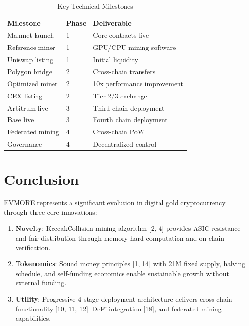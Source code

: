 \documentclass[11pt,a4paper]{article}
\begin{document}
\begin{table}[h]
\centering
\begin{tabular}{@{}lll@{}}
\toprule
\textbf{Milestone} & \textbf{Phase} & \textbf{Deliverable} \\
\midrule
Mainnet launch & 1 & Core contracts live \\
Reference miner & 1 & GPU/CPU mining software \\
Uniswap listing & 1 & Initial liquidity \\
Polygon bridge & 2 & Cross-chain transfers \\
Optimized miner & 2 & 10x performance improvement \\
CEX listing & 2 & Tier 2/3 exchange \\
Arbitrum live & 3 & Third chain deployment \\
Base live & 3 & Fourth chain deployment \\
Federated mining & 4 & Cross-chain PoW \\
Governance & 4 & Decentralized control \\
\bottomrule
\end{tabular}
\caption{Key Technical Milestones}
\end{table}

\section{Conclusion}

EVMORE represents a significant evolution in digital gold cryptocurrency through three core innovations:

\begin{enumerate}
    \item \textbf{Novelty}: KeccakCollision mining algorithm [2, 4] provides ASIC resistance and fair distribution through memory-hard computation and on-chain verification.

    \item \textbf{Tokenomics}: Sound money principles [1, 14] with 21M fixed supply, halving schedule, and self-funding economics enable sustainable growth without external funding.

    \item \textbf{Utility}: Progressive 4-stage deployment architecture delivers cross-chain functionality [10, 11, 12], DeFi integration [18], and federated mining capabilities.
\end{enumerate}
\end{document}
